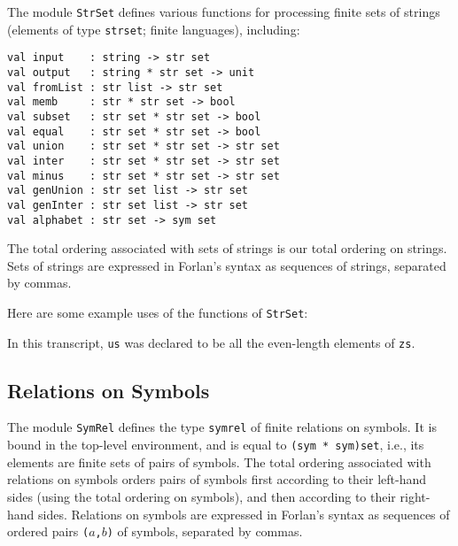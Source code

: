 The module \texttt{StrSet}
%
defines various functions for processing
finite sets of strings (elements of type \texttt{str\;set};
%
finite languages),
%
including:
\begin{verbatim}
val input    : string -> str set
val output   : string * str set -> unit
val fromList : str list -> str set
val memb     : str * str set -> bool
val subset   : str set * str set -> bool
val equal    : str set * str set -> bool
val union    : str set * str set -> str set
val inter    : str set * str set -> str set
val minus    : str set * str set -> str set
val genUnion : str set list -> str set
val genInter : str set list -> str set
val alphabet : str set -> sym set
\end{verbatim}
%
%
%
%
%
%
%
%
%
%
%
%
The total ordering associated with sets of strings is our
total ordering on strings.
Sets of strings are expressed in Forlan's syntax as sequences of strings,
separated by commas.

Here are some example uses of the functions of \texttt{StrSet}:

In this transcript, \texttt{us} was declared to be all the even-length
elements of \texttt{zs}.

\subsection{Relations on Symbols}

The module \texttt{SymRel}
%
defines the type \texttt{sym\underscoresym rel}
%
%
of finite relations on symbols.
%
It is bound in the top-level environment, and is
equal to \texttt{(sym * sym)set}, i.e., its elements are finite sets
of pairs of symbols.  The total ordering associated with relations
on symbols orders pairs of symbols first according to their
left-hand sides (using the total ordering on symbols), and then
according to their right-hand sides.
Relations on symbols are expressed in Forlan's syntax as sequences of ordered
pairs \texttt{($a$,$b$)} of symbols, separated by commas.
%
%

